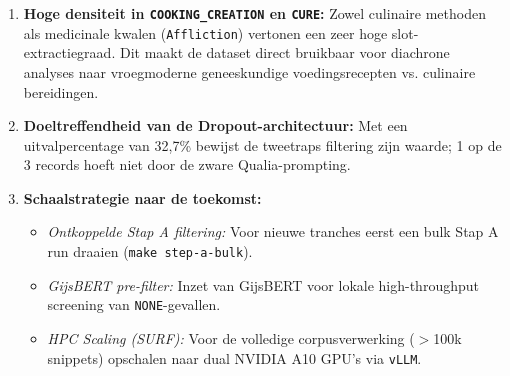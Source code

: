 \documentclass[a4paper,11pt]{article}
\begin{document}
\begin{enumerate}
    \item \textbf{Hoge densiteit in \texttt{COOKING\_CREATION} en \texttt{CURE}:} Zowel culinaire methoden als medicinale kwalen (\texttt{Affliction}) vertonen een zeer hoge slot-extractiegraad. Dit maakt de dataset direct bruikbaar voor diachrone analyses naar vroegmoderne geneeskundige voedingsrecepten vs. culinaire bereidingen.
    \item \textbf{Doeltreffendheid van de Dropout-architectuur:} Met een uitvalpercentage van 32,7\% bewijst de tweetraps filtering zijn waarde; 1 op de 3 records hoeft niet door de zware Qualia-prompting.
    \item \textbf{Schaalstrategie naar de toekomst:}
    \begin{itemize}
        \item \emph{Ontkoppelde Stap A filtering:} Voor nieuwe tranches eerst een bulk Stap A run draaien (\texttt{make step-a-bulk}).
        \item \emph{GijsBERT pre-filter:} Inzet van GijsBERT voor lokale high-throughput screening van \texttt{NONE}-gevallen.
        \item \emph{HPC Scaling (SURF):} Voor de volledige corpusverwerking ($>$100k snippets) opschalen naar dual NVIDIA A10 GPU's via \texttt{vLLM}.
    \end{itemize}
\end{enumerate}
\end{document}
